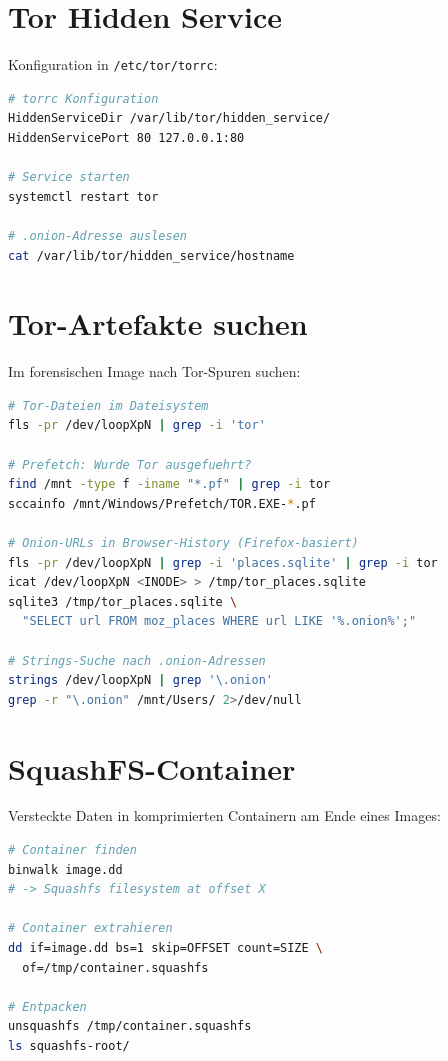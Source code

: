 \section{Tor Hidden Service}

Konfiguration in \texttt{/etc/tor/torrc}:

\begin{lstlisting}[language=bash]
# torrc Konfiguration
HiddenServiceDir /var/lib/tor/hidden_service/
HiddenServicePort 80 127.0.0.1:80

# Service starten
systemctl restart tor

# .onion-Adresse auslesen
cat /var/lib/tor/hidden_service/hostname
\end{lstlisting}

\section{Tor-Artefakte suchen}

Im forensischen Image nach Tor-Spuren suchen:

\begin{lstlisting}[language=bash]
# Tor-Dateien im Dateisystem
fls -pr /dev/loopXpN | grep -i 'tor'

# Prefetch: Wurde Tor ausgefuehrt?
find /mnt -type f -iname "*.pf" | grep -i tor
sccainfo /mnt/Windows/Prefetch/TOR.EXE-*.pf

# Onion-URLs in Browser-History (Firefox-basiert)
fls -pr /dev/loopXpN | grep -i 'places.sqlite' | grep -i tor
icat /dev/loopXpN <INODE> > /tmp/tor_places.sqlite
sqlite3 /tmp/tor_places.sqlite \
  "SELECT url FROM moz_places WHERE url LIKE '%.onion%';"

# Strings-Suche nach .onion-Adressen
strings /dev/loopXpN | grep '\.onion'
grep -r "\.onion" /mnt/Users/ 2>/dev/null
\end{lstlisting}

\section{SquashFS-Container}

Versteckte Daten in komprimierten Containern am Ende eines Images:

\begin{lstlisting}[language=bash]
# Container finden
binwalk image.dd
# -> Squashfs filesystem at offset X

# Container extrahieren
dd if=image.dd bs=1 skip=OFFSET count=SIZE \
  of=/tmp/container.squashfs

# Entpacken
unsquashfs /tmp/container.squashfs
ls squashfs-root/
\end{lstlisting}


